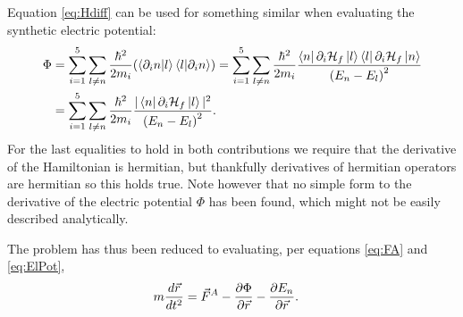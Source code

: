 \documentclass[a4paper]{article}
\begin{document}
Equation \ref{eq:Hdiff} can be used for something similar when evaluating the synthetic
electric potential:
\begin{align}\label{eq:ElPot}
        \Phi &= \sum_{i=1}^{5} \sum_{l \ne n} \frac{\hbar{}^2}{2m_i}\pqty{\bra{\partial_i
    n}\ket{l}\bra{l}\ket{\partial_i n}} = \sum_{i=1}^{5} \sum_{l \ne n}
    \frac{\hbar{}^2}{2m_i}\frac{\bra{n}\partial_i \mathbb{\cal H}_f\ket{l}\bra{l}\partial_i
    \mathbb{\cal H}_f\ket{n}}{\pqty{E_n-E_l}^2}\\
    &= \sum_{i=1}^{5} \sum_{l \ne n}
    \frac{\hbar{}^2}{2m_i}\frac{|\bra{n}\partial_i \mathbb{\cal H}_f\ket{l}|^2}{\pqty{E_n-E_l}^2}
.\end{align}
For the last equalities to hold in both contributions we require that the derivative of the Hamiltonian is
hermitian, but thankfully derivatives of hermitian operators are hermitian so this holds
true.
Note however that no simple form to the derivative of the electric potential \(\Phi\) has
been found, which might not be easily described analytically.

The problem has thus been reduced to evaluating, per equations \ref{eq:FA} and
\ref{eq:ElPot},
\begin{align}\label{eq:dynfin}
        m\frac{d \vec{r}}{d t^2} &= \vec{F}^A-\frac{\partial \Phi}{\partial
        \vec{r}} - \frac{\partial E_n}{\partial \vec{r}} 
.\end{align}
\end{document}
